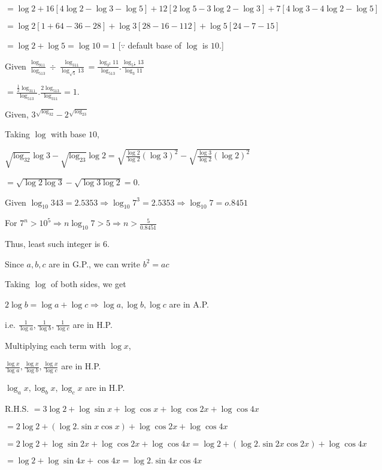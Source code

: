   $= \log 2 + 16[4\log 2 - \log 3 - \log 5] + 12[2\log 5 - 3\log 2 - \log 3] + 7[4\log 3 - 4\log 2 - \log 5]$

  $= \log 2[1 + 64 - 36 - 28] + \log 3[28 - 16 -1 12] + \log 5[24 - 7 - 15]$

  $= \log 2 + \log 5 = \log 10 = 1$ [$\because$ default base of $\log$ is $10$.]
\item Given $\frac{\log_911}{\log_513}\div\frac{\log_311}{\log_{\sqrt{5}}13} =
  \frac{\log_{3^2}11}{\log_513}.\frac{\log_{5^{\tfrac{1}{2}}}13}{\log_3 11}$

  $= \frac{\tfrac{1}{2}\log_311}{\log_513}.\frac{2\log_513}{\log_311} = 1$.
\item Given, $3^{\sqrt{\log_32}} - 2^{\sqrt{\log_23}}$

  Taking $\log$ with base $10$,

  $\sqrt{\log_32}\log 3 - \sqrt{\log_23}\log 2 = \sqrt{\frac{\log 2}{\log 2}(\log 3)^2} - \sqrt{\frac{\log 3}{\log 2}(\log 2)^2}$

  $= \sqrt{\log 2\log 3} - \sqrt{\log 3\log 2} = 0$.
\item Given $\log_{10}343 = 2.5353 \Rightarrow \log_{10}7^3 = 2.5353 \Rightarrow \log_{10}7 = o.8451$

  For $7^n > 10^5 \Rightarrow n\log_{10}7 > 5 \Rightarrow n > \frac{5}{0.8451}$

  Thus, least such integer is $6$.
\item Since $a, b, c$ are in G.P., we can write $b^2 = ac$

  Taking $\log$ of both sides, we get

  $2\log b = \log a + \log c \Rightarrow \log a, \log b, \log c$ are in A.P.

  i.e. $\frac{1}{\log a}, \frac{1}{\log b}, \frac{1}{\log c}$ are in H.P.

  Multiplying each term with $\log x$,

  $\frac{\log x}{\log a}, \frac{\log x}{\log b}, \frac{\log x}{\log c}$ are in H.P.

  $\log_ax, \log_bx, \log_cx$ are in H.P.
\item R.H.S. $= 3\log2 + \log\sin x + \log\cos x + \log\cos2x + \log\cos4x$

  $= 2\log 2 + (\log 2.\sin x\cos x) + \log\cos2x + \log\cos4x$

  $= 2\log 2 + \log\sin2x + \log\cos2x + \log\cos4x = \log 2 + (\log 2.\sin2x\cos2x) + \log\cos4x$

  $= \log 2 + \log\sin4x + \cos4x = \log 2.\sin4x\cos4x$

